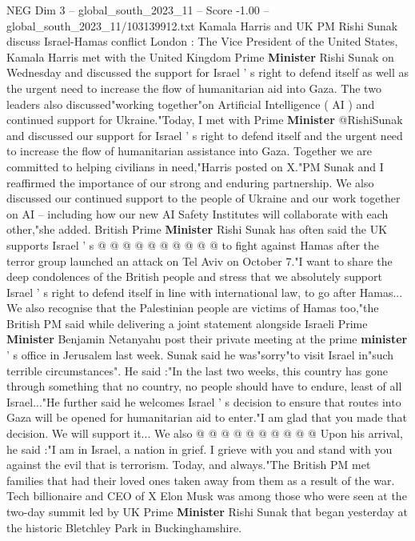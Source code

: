 \begin{textsample}{NEG Dim 3 – global\_south\_2023\_11 – Score -1.00 – global\_south\_2023\_11/103139912.txt}  \label{ex:f3_neg_107}
Kamala Harris and UK PM Rishi Sunak discuss Israel-Hamas conflict London : The Vice President of the United States, Kamala Harris met with the United Kingdom Prime \textbf{Minister} Rishi Sunak on Wednesday and discussed the support for Israel ' s right to defend itself as well as the urgent need to increase the flow of humanitarian aid into Gaza.
The two leaders also discussed"working together"on Artificial Intelligence ( AI ) and continued support for Ukraine."Today, I met with Prime \textbf{Minister} @RishiSunak and discussed our support for Israel ' s right to defend itself and the urgent need to increase the flow of humanitarian assistance into Gaza.
Together we are committed to helping civilians in need,"Harris posted on X."PM Sunak and I reaffirmed the importance of our strong and enduring partnership.
We also discussed our continued support to the people of Ukraine and our work together on AI -- including how our new AI Safety Institutes will collaborate with each other,"she added.
British Prime \textbf{Minister} Rishi Sunak has often said the UK supports Israel ' s @ @ @ @ @ @ @ @ @ @ to fight against Hamas after the terror group launched an attack on Tel Aviv on October 7."I want to share the deep condolences of the British people and stress that we absolutely support Israel ' s right to defend itself in line with international law, to go after Hamas...
We also recognise that the Palestinian people are victims of Hamas too,"the British PM said while delivering a joint statement alongside Israeli Prime \textbf{Minister} Benjamin Netanyahu post their private meeting at the prime \textbf{minister} ' s office in Jerusalem last week.
Sunak said he was"sorry"to visit Israel in"such terrible circumstances".
He said :"In the last two weeks, this country has gone through something that no country, no people should have to endure, least of all Israel..."He further said he welcomes Israel ' s decision to ensure that routes into Gaza will be opened for humanitarian aid to enter."I am glad that you made that decision.
We will support it...
We also @ @ @ @ @ @ @ @ @ @ Upon his arrival, he said :"I am in Israel, a nation in grief.
I grieve with you and stand with you against the evil that is terrorism.
Today, and always."The British PM met families that had their loved ones taken away from them as a result of the war.
Tech billionaire and CEO of X Elon Musk was among those who were seen at the two-day summit led by UK Prime \textbf{Minister} Rishi Sunak that began yesterday at the historic Bletchley Park in Buckinghamshire.

\end{textsample}
